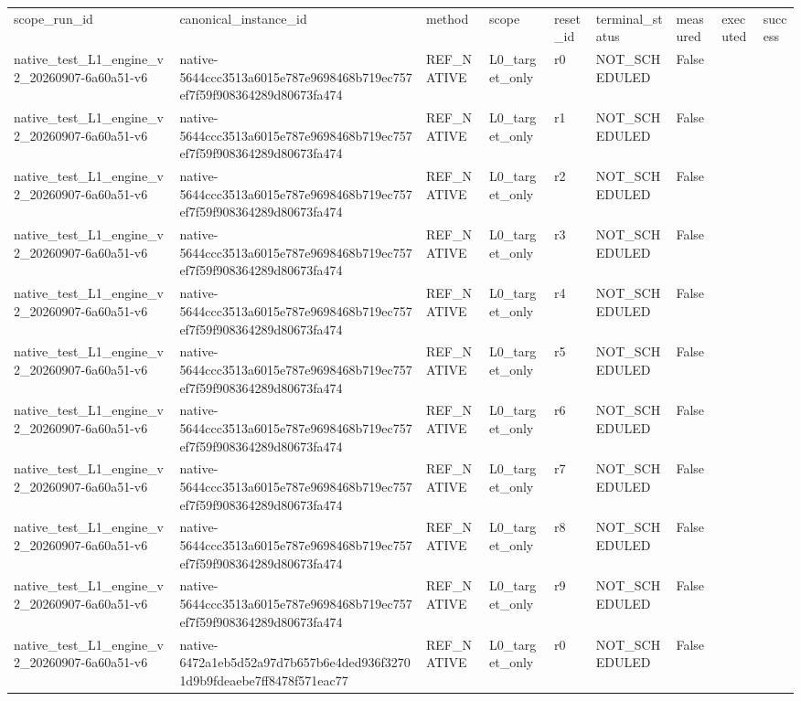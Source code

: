 \begin{tabular}{lllllllll}
scope\_run\_id & canonical\_instance\_id & method & scope & reset\_id & terminal\_status & measured & executed & success \\
native\_test\_L1\_engine\_v2\_20260907-6a60a51-v6 & native-5644ccc3513a6015e787e9698468b719ec757ef7f59f908364289d80673fa474 & REF\_NATIVE & L0\_target\_only & r0 & NOT\_SCHEDULED & False &  &  \\
native\_test\_L1\_engine\_v2\_20260907-6a60a51-v6 & native-5644ccc3513a6015e787e9698468b719ec757ef7f59f908364289d80673fa474 & REF\_NATIVE & L0\_target\_only & r1 & NOT\_SCHEDULED & False &  &  \\
native\_test\_L1\_engine\_v2\_20260907-6a60a51-v6 & native-5644ccc3513a6015e787e9698468b719ec757ef7f59f908364289d80673fa474 & REF\_NATIVE & L0\_target\_only & r2 & NOT\_SCHEDULED & False &  &  \\
native\_test\_L1\_engine\_v2\_20260907-6a60a51-v6 & native-5644ccc3513a6015e787e9698468b719ec757ef7f59f908364289d80673fa474 & REF\_NATIVE & L0\_target\_only & r3 & NOT\_SCHEDULED & False &  &  \\
native\_test\_L1\_engine\_v2\_20260907-6a60a51-v6 & native-5644ccc3513a6015e787e9698468b719ec757ef7f59f908364289d80673fa474 & REF\_NATIVE & L0\_target\_only & r4 & NOT\_SCHEDULED & False &  &  \\
native\_test\_L1\_engine\_v2\_20260907-6a60a51-v6 & native-5644ccc3513a6015e787e9698468b719ec757ef7f59f908364289d80673fa474 & REF\_NATIVE & L0\_target\_only & r5 & NOT\_SCHEDULED & False &  &  \\
native\_test\_L1\_engine\_v2\_20260907-6a60a51-v6 & native-5644ccc3513a6015e787e9698468b719ec757ef7f59f908364289d80673fa474 & REF\_NATIVE & L0\_target\_only & r6 & NOT\_SCHEDULED & False &  &  \\
native\_test\_L1\_engine\_v2\_20260907-6a60a51-v6 & native-5644ccc3513a6015e787e9698468b719ec757ef7f59f908364289d80673fa474 & REF\_NATIVE & L0\_target\_only & r7 & NOT\_SCHEDULED & False &  &  \\
native\_test\_L1\_engine\_v2\_20260907-6a60a51-v6 & native-5644ccc3513a6015e787e9698468b719ec757ef7f59f908364289d80673fa474 & REF\_NATIVE & L0\_target\_only & r8 & NOT\_SCHEDULED & False &  &  \\
native\_test\_L1\_engine\_v2\_20260907-6a60a51-v6 & native-5644ccc3513a6015e787e9698468b719ec757ef7f59f908364289d80673fa474 & REF\_NATIVE & L0\_target\_only & r9 & NOT\_SCHEDULED & False &  &  \\
native\_test\_L1\_engine\_v2\_20260907-6a60a51-v6 & native-6472a1eb5d52a97d7b657b6e4ded936f32701d9b9fdeaebe7ff8478f571eac77 & REF\_NATIVE & L0\_target\_only & r0 & NOT\_SCHEDULED & False &  &  \\

\end{tabular}
